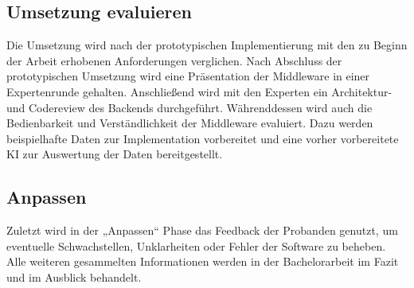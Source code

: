 \subsection{Umsetzung evaluieren}
Die Umsetzung wird nach der prototypischen Implementierung mit den zu Beginn der
Arbeit erhobenen Anforderungen verglichen. Nach Abschluss der prototypischen Umsetzung
wird eine Präsentation der Middleware in einer Expertenrunde gehalten. Anschließend
wird mit den Experten ein Architektur- und Codereview des Backends durchgeführt.
Währenddessen wird auch die Bedienbarkeit und Verständlichkeit der Middleware evaluiert. Dazu werden beispielhafte Daten zur Implementation vorbereitet und eine vorher
vorbereitete KI zur Auswertung der Daten bereitgestellt.

\subsection{Anpassen}
Zuletzt wird in der „Anpassen“ Phase das Feedback der Probanden genutzt, um eventuelle
Schwachstellen, Unklarheiten oder Fehler der Software zu beheben. Alle weiteren
gesammelten Informationen werden in der Bachelorarbeit im Fazit und im Ausblick behandelt.